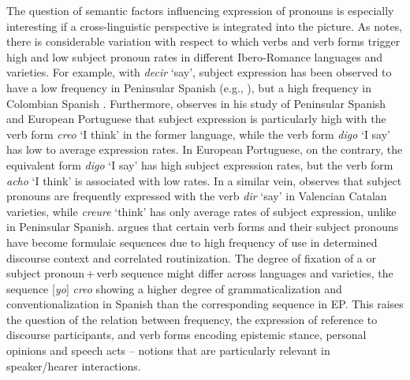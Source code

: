 \documentclass[output=paper]{langscibook}
\begin{document}
The question of semantic factors influencing expression of pronouns is especially interesting if a cross-linguistic perspective is integrated into the picture. As \citet{Posio2018} notes, there is considerable variation with respect to which verbs and verb forms trigger high and low subject pronoun rates in different Ibero-Romance languages and varieties. For example, with \textit{decir}  ‘say’, subject expression has been observed to have a low frequency in Peninsular Spanish (e.g., \citealt{Posio2013,Posio2014}), but a high frequency in Colombian Spanish \citep[25]{Orozco2015}. Furthermore, \citet{Posio2013,Posio2014} observes in his study of Peninsular Spanish and European Portuguese that  subject expression is particularly high with the verb form  \textit{creo}  ‘I think’   in the former language, while the verb form \textit{digo}  ‘I say’ has low to average expression rates. In European Portuguese, on the contrary, the equivalent form \textit{digo}  ‘I say’ has high subject expression rates, but the verb form \textit{acho}  ‘I think’ is associated with low rates. In a similar vein, \citet{HerbeckForthcoming} observes that  subject pronouns are frequently expressed with the verb \textit{dir}  ‘say’ in Valencian Catalan varieties, while \textit{creure}  ‘think’ has only average rates of  subject expression, unlike in Peninsular Spanish. \citet{Posio2013,Posio2014,Posio2015} argues that certain verb forms and their subject pronouns have become formulaic sequences due to high frequency of use in determined discourse context and correlated routinization. The degree of fixation of a  or  subject pronoun\,+\,verb sequence might differ across languages and varieties, the sequence [\textit{yo}] \textit{creo}  showing a higher degree of grammaticalization and conventionalization in Spanish than the corresponding sequence in EP. This raises the question of the relation between frequency, the expression of reference to discourse participants, and verb forms encoding epistemic stance, personal opinions and speech acts – notions that are particularly relevant in speaker/hearer interactions.
\end{document}

